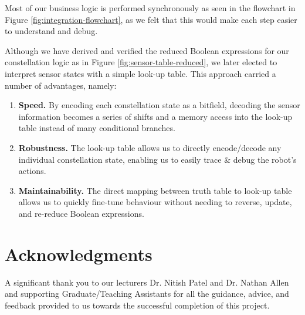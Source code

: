 \documentclass[conference]{IEEEtran}
\begin{document}
Most of our business logic is performed synchronously as seen in the flowchart in Figure \ref{fig:integration-flowchart}, as we felt that this would make each step easier to understand and debug.

Although we have derived and verified the reduced Boolean expressions for our constellation logic as in Figure \ref{fig:sensor-table-reduced}, we later elected to interpret sensor states with a simple look-up table.
This approach carried a number of advantages, namely:
\begin{enumerate}
	\item \textbf{Speed.} By encoding each constellation state as a bitfield, decoding the sensor information becomes a series of shifts and a memory access into the look-up table instead of many conditional branches.
	\item \textbf{Robustness.} The look-up table allows us to directly encode/decode any individual constellation state, enabling us to easily trace \& debug the robot's actions.
	\item \textbf{Maintainability.} The direct mapping between truth table to look-up table allows us to quickly fine-tune behaviour without needing to reverse, update, and re-reduce Boolean expressions.
\end{enumerate}



\section*{Acknowledgments}

A significant thank you to our lecturers Dr. Nitish Patel and Dr. Nathan Allen and supporting Graduate/Teaching Assistants for all the guidance, advice, and feedback provided to us towards the successful completion of this project.




% 
% 



\appendix

\end{document}
